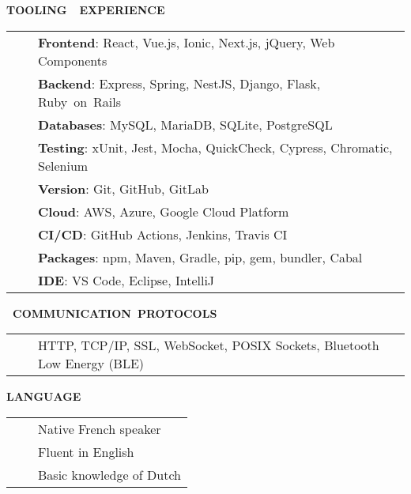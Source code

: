 \documentclass[a4paper,11pt,english]{article}
\newcommand{\LeftColumn}[0]{6.0cm}
\newcommand{\ToolCategory}[1]{\textbf{#1}}
\newcommand{\Bullet}[0]{\faCaretRight~~}
\newcommand{\Rubric}[1]{\colorbox{gray!20}{\parbox{\linewidth}{\centering\sffamily\bfseries{}#1}}}
\begin{document}
\begin{minipage}[t]{\LeftColumn}

\Rubric{\faTools \quad TOOLING~~EXPERIENCE}\vspace{8pt}

\begin{tabularx}{\linewidth}{@{}l@{}>{\raggedright\arraybackslash}X@{}}
\Bullet & \ToolCategory{Frontend}: React, Vue.js, Ionic, Next.js, jQuery, Web Components \\[0pt]
\Bullet & \ToolCategory{Backend}: Express, Spring, NestJS, Django, Flask, Ruby~on~Rails \\[0pt]
\Bullet & \ToolCategory{Databases}: MySQL, MariaDB, SQLite, PostgreSQL \\[0pt]
\Bullet & \ToolCategory{Testing}: xUnit, Jest, Mocha, QuickCheck, Cypress, Chromatic, Selenium \\[0pt]
\Bullet & \ToolCategory{Version}: Git, GitHub, GitLab \\[0pt]
\Bullet & \ToolCategory{Cloud}: AWS, Azure, Google Cloud Platform \\[0pt]
\Bullet & \ToolCategory{CI/CD}: GitHub Actions, Jenkins, Travis CI \\[0pt]
\Bullet & \ToolCategory{Packages}: npm, Maven, Gradle, pip, gem, bundler, Cabal \\[0pt]
\Bullet & \ToolCategory{IDE}: VS Code, Eclipse, IntelliJ \\[0pt]
\end{tabularx}

\vspace{12pt}\Rubric{\faNetworkWired~COMMUNICATION~PROTOCOLS}\vspace{8pt}

\begin{tabularx}{\linewidth}{@{}l@{}>{\raggedright\arraybackslash}X@{}}
\Bullet & HTTP, TCP/IP, SSL, WebSocket, POSIX Sockets, Bluetooth Low Energy (BLE) \\[0pt]
\end{tabularx}

\vspace{12pt}\Rubric{\faLanguage \quad LANGUAGE}\vspace{8pt}

\begin{tabularx}{\linewidth}{@{}l@{}l@{}}
\Bullet & Native French speaker \\[0pt]
\Bullet & Fluent in English \\[0pt]
\Bullet & Basic knowledge of Dutch \\[0pt]
\end{tabularx}


\end{minipage}
\end{document}
